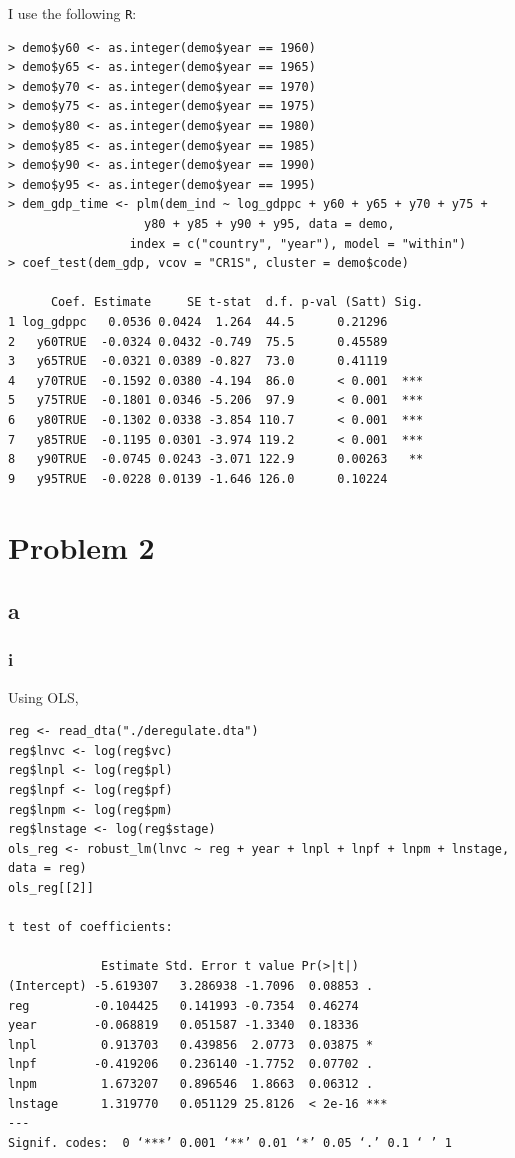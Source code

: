 \documentclass[12pt,letterpaper]{article}
\theoremstyle{definition}
\begin{document}
I use the following \verb|R|:
\begin{Verbatim}[fontsize=\small]
> demo$y60 <- as.integer(demo$year == 1960)
> demo$y65 <- as.integer(demo$year == 1965)
> demo$y70 <- as.integer(demo$year == 1970)
> demo$y75 <- as.integer(demo$year == 1975)
> demo$y80 <- as.integer(demo$year == 1980)
> demo$y85 <- as.integer(demo$year == 1985)
> demo$y90 <- as.integer(demo$year == 1990)
> demo$y95 <- as.integer(demo$year == 1995)
> dem_gdp_time <- plm(dem_ind ~ log_gdppc + y60 + y65 + y70 + y75 +
                   y80 + y85 + y90 + y95, data = demo,
                 index = c("country", "year"), model = "within")
> coef_test(dem_gdp, vcov = "CR1S", cluster = demo$code)

      Coef. Estimate     SE t-stat  d.f. p-val (Satt) Sig.
1 log_gdppc   0.0536 0.0424  1.264  44.5      0.21296
2   y60TRUE  -0.0324 0.0432 -0.749  75.5      0.45589
3   y65TRUE  -0.0321 0.0389 -0.827  73.0      0.41119
4   y70TRUE  -0.1592 0.0380 -4.194  86.0      < 0.001  ***
5   y75TRUE  -0.1801 0.0346 -5.206  97.9      < 0.001  ***
6   y80TRUE  -0.1302 0.0338 -3.854 110.7      < 0.001  ***
7   y85TRUE  -0.1195 0.0301 -3.974 119.2      < 0.001  ***
8   y90TRUE  -0.0745 0.0243 -3.071 122.9      0.00263   **
9   y95TRUE  -0.0228 0.0139 -1.646 126.0      0.10224
\end{Verbatim}

\section*{Problem 2}

\subsection*{a}

\subsubsection*{i}

Using OLS,
\begin{Verbatim}[fontsize=\small]
reg <- read_dta("./deregulate.dta")
reg$lnvc <- log(reg$vc)
reg$lnpl <- log(reg$pl)
reg$lnpf <- log(reg$pf)
reg$lnpm <- log(reg$pm)
reg$lnstage <- log(reg$stage)
ols_reg <- robust_lm(lnvc ~ reg + year + lnpl + lnpf + lnpm + lnstage, data = reg)
ols_reg[[2]]

t test of coefficients:

             Estimate Std. Error t value Pr(>|t|)
(Intercept) -5.619307   3.286938 -1.7096  0.08853 .
reg         -0.104425   0.141993 -0.7354  0.46274
year        -0.068819   0.051587 -1.3340  0.18336
lnpl         0.913703   0.439856  2.0773  0.03875 *
lnpf        -0.419206   0.236140 -1.7752  0.07702 .
lnpm         1.673207   0.896546  1.8663  0.06312 .
lnstage      1.319770   0.051129 25.8126  < 2e-16 ***
---
Signif. codes:  0 ‘***’ 0.001 ‘**’ 0.01 ‘*’ 0.05 ‘.’ 0.1 ‘ ’ 1
\end{Verbatim}
\end{document}
